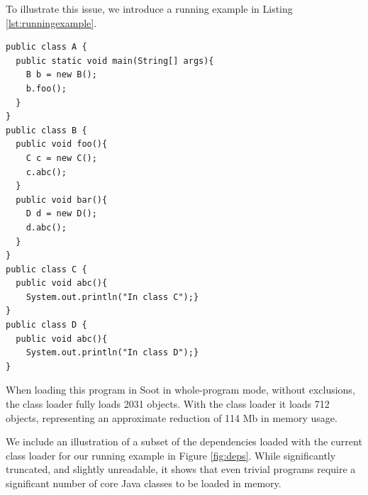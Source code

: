 \documentclass[preprint]{sigplanconf}
\begin{document}
To illustrate this issue, we introduce a running example in Listing \ref{lst:runningexample}.

\begin{lstlisting}[caption={Running example},label={lst:runningexample},float=!ht]
public class A {
  public static void main(String[] args){
    B b = new B();
    b.foo();
  }
}
public class B {
  public void foo(){
    C c = new C();
    c.abc();
  }
  public void bar(){
    D d = new D();
    d.abc();
  }
}
public class C {
  public void abc(){
    System.out.println("In class C");}
}
public class D {
  public void abc(){
    System.out.println("In class D");}
}
\end{lstlisting}

When loading this program in Soot in whole-program mode, without exclusions, the class loader fully loads 2031 \sootclass objects. With the \rb class loader it loads 712 \sootclass objects, representing an approximate reduction of 114 Mb in memory usage.


We include an illustration of a subset of the dependencies loaded with the current class loader for our running example in Figure \ref{fig:deps}. While significantly truncated, and slightly unreadable, it shows that even trivial programs require a significant number of core Java classes to be loaded in memory.
\end{document}
